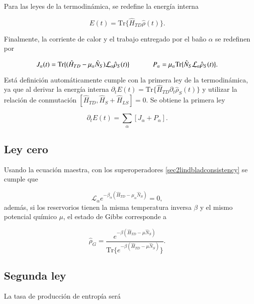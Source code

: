 Para las leyes de la termodinámica, se redefine la energía interna

\begin{equation*}
    E(t) = \text{Tr}\{\hat{H}_{TD}\hat{\rho}(t) \}.
\end{equation*}

Finalmente, la corriente de calor y el trabajo entregado por el baño $\alpha$ se redefinen por

\begin{equation*}
    J_{\alpha}(t) = \text{Tr}\{(\hat{H}_{TD} - \mu_{\alpha}\hat{N}_S)\mathcal{L}_{\alpha}\hat{\rho}_{S}(t) \} \hspace{12mm} P_{\alpha} = \mu_{\alpha} \text{Tr}\{\hat{N}_{S}\mathcal{L}_{\alpha}\hat{\rho}_{S}(t) \}.
\end{equation*}

Está definición automáticamente cumple con la primera ley de la termodinámica, ya que al derivar la energía interna $\partial_{t}E(t) = \text{Tr}\{ \hat{H}_{TD}\partial_{t}\hat{\rho}_{S}(t) \}$ y utilizar la relación de conmutación $[\hat{H}_{TD},\hat{H}_{S} + \hat{H}_{LS}] = 0$. Se obtiene la primera ley

\begin{equation*}
    \partial_{t}E(t) = \sum_{\alpha}[J_{\alpha} + P_{\alpha}].
\end{equation*}

\subsection{Ley cero}
Usando la ecuación maestra, con los superoperadores \ref{sec2lindbladconsistency} se cumple que

\begin{equation}
    \mathcal{L}_{\alpha}e^{-\beta_{\alpha}(\hat{H}_{TD} - \mu_{\alpha}\hat{N}_{S})} = 0,
\label{sec2cerolaw}
\end{equation}
además, si los reservorios tienen la misma temperatura inversa $\beta$ y el mismo potencial químico $\mu$, el estado de Gibbs corresponde a 

\begin{equation*}
    \hat{\rho}_G = \frac{e^{-\beta(\hat{H}_{TD} - \mu \hat{N}_{S})}}{\text{Tr}\{ e^{-\beta(\hat{H}_{TD} - \mu \hat{N}_{S})}\}}.
\end{equation*}

\subsection{Segunda ley}
La tasa de producción de entropía será 

